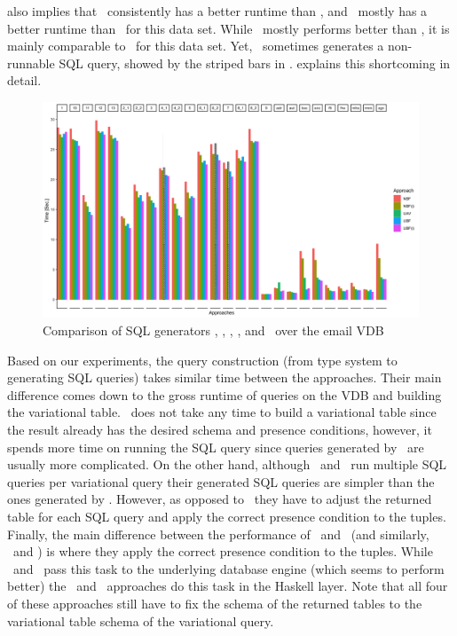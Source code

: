 %
 also implies that \nbfi\ consistently has a better
runtime than \nbf, and \ubfi\ mostly has a better runtime than \ubf\ for this data set. While
\uav\ mostly performs better than \nbfi, it is mainly comparable to \ubfi\ for this data set. Yet, \uav\
sometimes generates a non-runnable SQL query, showed by the striped bars in .
\exref{uav-fail} explains this shortcoming in detail. 


\begin{figure}[!t]
\centering
\includegraphics[width = \linewidth] {figs/plots/enron1-5.png}
\caption[Comparison of SQL generators \nbf, \nbfi, \uav, \ubf, and \ubfi\ over the email VDB]{Comparison of SQL generators \nbf, \nbfi, \uav, \ubf, and \ubfi\ over the email VDB}
\label{fig:enron1-5}
\end{figure}


%
Based on our experiments, the query construction (from type system to generating SQL queries) takes
similar time between the approaches. Their main difference comes down to the gross runtime
of queries on the VDB and building the variational table. 
%
\uav\ does not take any time to build a variational table since the result already has the
desired schema and presence conditions, however, it spends more time on running the 
SQL query since queries generated by \uav\ are usually more complicated. 
%
On the other hand, although \nbf\ and \ubf\ run multiple SQL queries per variational query
their generated SQL queries are simpler than the ones generated by \uav. However,
as opposed to \uav\ they have to adjust the returned table for each SQL query and apply
the correct presence condition to the tuples. 
%
Finally, the main difference between the performance of  \nbf\ and \nbfi\ (and similarly, \ubf\ and \ubfi)
is where they apply the correct presence condition to the tuples. While \nbfi\ and \ubfi\ pass this
task to the underlying database engine (which seems to perform better) the \nbf\ and \ubf\ approaches 
do this task in the Haskell layer.
Note that all four of these approaches still have to fix the schema of the returned
tables to the variational table schema of the variational query. 

